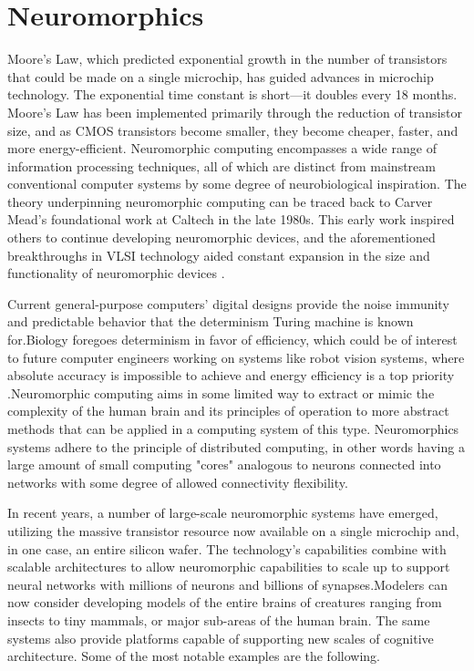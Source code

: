 \documentclass[12pt]{report}
\begin{document}
\chapter{Neuromorphics}
Moore's Law, which predicted exponential growth in the number of transistors that could be made on a single microchip, has guided advances in microchip technology. The exponential time constant is short—it doubles every 18 months. Moore's Law has been implemented primarily through the reduction of transistor size, and as CMOS transistors become smaller, they become cheaper, faster, and more energy-efficient.
Neuromorphic computing encompasses a wide range of information processing techniques, all of which are distinct from mainstream conventional computer systems by some degree of neurobiological inspiration. The theory underpinning neuromorphic computing can be traced back to Carver Mead's foundational work at Caltech in the late 1980s. This early work inspired others to continue developing neuromorphic devices, and the aforementioned breakthroughs in VLSI technology aided constant expansion in the size and functionality of neuromorphic devices \cite{furber2016}.

Current general-purpose computers' digital designs provide the noise immunity and predictable behavior that the determinism Turing machine is known for.Biology foregoes determinism in favor of efficiency, which could be of interest to future computer engineers working on systems like robot vision systems, where absolute accuracy is impossible to achieve and energy efficiency is a top priority .Neuromorphic computing aims in some limited way to extract or mimic  the complexity of the human brain and its principles of operation to more abstract methods that can be applied in a computing system of this type. Neuromorphics systems adhere to the principle of distributed computing, in other words having a large amount of small computing "cores" analogous to neurons connected into networks with some degree of allowed connectivity flexibility. 

In recent years, a number of large-scale neuromorphic systems have emerged, utilizing the massive transistor resource now available on a single microchip and, in one case, an entire silicon wafer. The technology's capabilities combine with scalable architectures to allow neuromorphic capabilities to scale up to support neural networks with millions of neurons and billions of synapses.Modelers can now consider developing models of the entire brains of creatures ranging from insects to tiny mammals, or major sub-areas of the human brain. The same systems also provide platforms capable of supporting new scales of cognitive architecture. Some of the most notable examples are the following.
\end{document}
